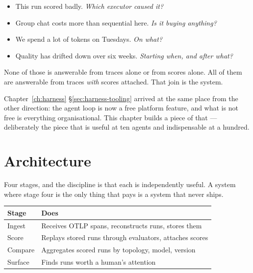 \begin{itemize}[leftmargin=1.4em]
\item This run scored badly. \emph{Which executor caused it?}
\item Group chat costs more than sequential here. \emph{Is it buying anything?}
\item We spend a lot of tokens on Tuesdays. \emph{On what?}
\item Quality has drifted down over six weeks. \emph{Starting when, and after
      what?}
\end{itemize}

None of those is answerable from traces alone or from scores alone. All of them
are answerable from traces \emph{with} scores attached. That join is the system.

\begin{note}
Chapter~\ref{ch:harness} \S\ref{sec:harness-tooling} arrived at the same place
from the other direction: the agent loop is now a free platform feature, and what
is not free is everything organisational. This chapter builds a piece of that
--- deliberately the piece that is useful at ten agents and indispensable at a
hundred.
\end{note}

\section{Architecture}
\label{sec:cap-architecture}

Four stages, and the discipline is that each is independently useful. A system
where stage four is the only thing that pays is a system that never ships.

\begin{center}
\small
\begin{tabularx}{\linewidth}{@{}lX@{}}
\toprule
\textbf{Stage} & \textbf{Does} \\
\midrule
Ingest & Receives OTLP spans, reconstructs runs, stores them \\[4pt]
Score & Replays stored runs through evaluators, attaches scores \\[4pt]
Compare & Aggregates scored runs by topology, model, version \\[4pt]
Surface & Finds runs worth a human's attention \\
\bottomrule
\end{tabularx}
\end{center}

